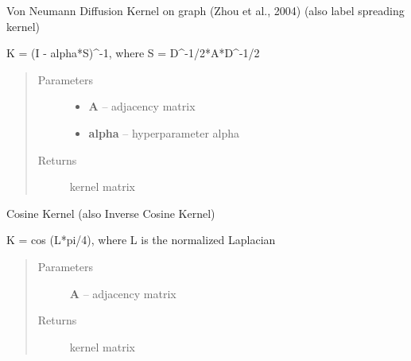 \documentclass[letterpaper,10pt,english]{sphinxmanual}
\begin{document}
\begin{fulllineitems}
\label{pyGPs.GraphExtensions:pyGPs.GraphExtensions.nodeKernels.VNDKernel}
Von Neumann Diffusion Kernel on graph (Zhou et al., 2004)
(also label spreading kernel)

K = (I - alpha*S)\textasciicircum{}-1, where S = D\textasciicircum{}-1/2*A*D\textasciicircum{}-1/2
\begin{quote}\begin{description}
\item[{Parameters}] \leavevmode\begin{itemize}
\item {} 
\textbf{A} -- adjacency matrix

\item {} 
\textbf{alpha} -- hyperparameter alpha

\end{itemize}

\item[{Returns}] \leavevmode
kernel matrix

\end{description}\end{quote}

\end{fulllineitems}


\begin{fulllineitems}
\label{pyGPs.GraphExtensions:pyGPs.GraphExtensions.nodeKernels.cosKernel}
Cosine Kernel (also Inverse Cosine Kernel)

K = cos (L*pi/4), where L is the normalized Laplacian
\begin{quote}\begin{description}
\item[{Parameters}] \leavevmode
\textbf{A} -- adjacency matrix

\item[{Returns}] \leavevmode
kernel matrix

\end{description}\end{quote}

\end{fulllineitems}

\end{document}
